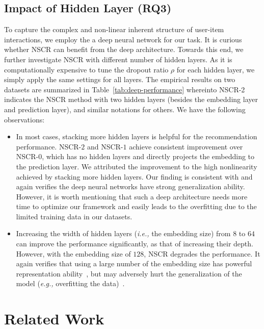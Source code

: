 \documentclass[sigconf]{acmart}
\newcommand{\ie}{\emph{i.e., }}
\newcommand{\eg}{\emph{e.g., }}
\begin{document}
		\subsection{Impact of Hidden Layer (RQ3)}
		To capture the complex and non-linear inherent structure of user-item interactions, we employ the a deep neural network for our task. It is curious whether NSCR can benefit from the deep architecture. Towards this end, we further investigate NSCR with different number of hidden layers. As it is computationally expensive to tune the dropout ratio $\rho$ for each hidden layer, we simply apply the same settings for all layers. The empirical results on two datasets are summarized in Table~\ref{tab:deep-performance} whereinto NSCR-2 indicates the NSCR method with two hidden layers (besides the embedding layer and prediction layer), and similar notations for others. We have the following observations:
		
		\begin{itemize}[leftmargin=*]
			\item In most cases, stacking more hidden layers is helpful for the recommendation performance. NSCR-$2$ and NSCR-$1$ achieve consistent improvement over NSCR-$0$, which has no hidden layers and directly projects the embedding to the prediction layer. We attributed the improvement to the high nonlinearity achieved by stacking more hidden layers. Our finding is consistent with \cite{DBLP:conf/cvpr/HeZRS16} and again verifies the deep neural networks have strong generalization ability. However, it is worth mentioning that such a deep architecture needs more time to optimize our framework and easily leads to the overfitting due to the limited training data in our datasets.
			\item Increasing the width of hidden layers (\ie the embedding size) from $8$ to $64$ can improve the performance significantly, as that of increasing their depth. However, with the embedding size of $128$, NSCR degrades the performance. It again verifies that using a large number of the embedding size has powerful representation ability~\cite{DBLP:conf/cvpr/HeZRS16}, but may adversely hurt the generalization of the model (\eg overfitting the data)~\cite{heneural,DBLP:conf/cvpr/HeZRS16}.
		\end{itemize}
		
		
		
\section{Related Work}
\end{document}
